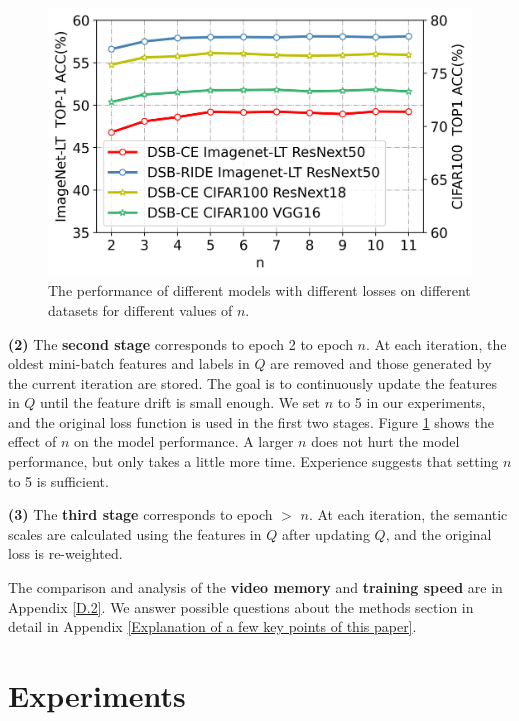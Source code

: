 \documentclass[10pt]{article} %
\begin{document}
\begin{figure} %
\begin{center}
\vskip -0.3in
\includegraphics[width=0.52\columnwidth]{fig8}
\vskip -0.25in
\caption{The performance of different models with different losses on different datasets for different values of $n$.}
\label{fig8}
\end{center}
\end{figure}


\textbf{(2)} The \textbf{second stage} corresponds to epoch 2 to epoch $n$. At each iteration, the oldest mini-batch features and labels in $Q$ are removed and those generated by the current iteration are stored. The goal is to continuously update the features in $Q$ until the feature drift is small enough. We set $n$ to 5 in our experiments, and the original loss function is used in the first two stages. Figure \ref{fig8} shows the effect of $n$ on the model performance. A larger $n$ does not hurt the model performance, but only takes a little more time. Experience suggests that setting $n$ to 5 is sufficient. 

\textbf{(3)} The \textbf{third stage} corresponds to epoch $>$ $n$. At each iteration, the semantic scales are calculated using the features in $Q$ after updating $Q$, and the original loss is re-weighted. 

The comparison and analysis of the \textbf{video memory} and \textbf{training speed} are in Appendix \ref{D.2}. We answer possible questions about the methods section in detail in Appendix \ref{Explanation of a few key points of this paper}.

\section{Experiments\label{5}}
\end{document}
